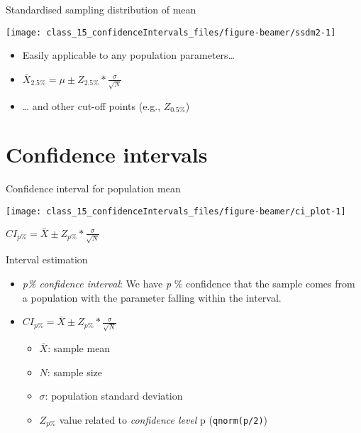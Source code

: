 \documentclass[
  ignorenonframetext,
]{beamer}
\providecommand{\tightlist}{%
  \setlength{\itemsep}{0pt}\setlength{\parskip}{0pt}}
\begin{document}
\begin{frame}{Standardised sampling distribution of mean}
\label{standardised-sampling-distribution-of-mean-1}
\begin{center}\texttt{[image: class\_15\_confidenceIntervals\_files/figure-beamer/ssdm2-1]} \end{center}

\begin{itemize}
\tightlist
\item
  Easily applicable to any population parameters\ldots{}
\item
  \(\bar{X}_{2.5\%} = \mu \pm Z_{2.5\%} * \frac{\sigma}{\sqrt{N}}\)
\item
  \ldots{} and other cut-off points (e.g., \(Z_{0.5\%}\))
\end{itemize}
\end{frame}

\section{Confidence intervals}\label{confidence-intervals}

\begin{frame}{Confidence interval for population mean}
\label{confidence-interval-for-population-mean}
\begin{center}\texttt{[image: class\_15\_confidenceIntervals\_files/figure-beamer/ci\_plot-1]} \end{center}

\(CI_{p\%} = \bar{X} \pm Z_{p\%} * \frac{\sigma}{\sqrt{N}}\)
\end{frame}

\begin{frame}[fragile]{Interval estimation}
\label{interval-estimation}
\begin{itemize}
\item
  \emph{p\% confidence interval}: We have \emph{p} \% confidence that
  the sample comes from a population with the parameter falling within
  the interval.
\item
  \(CI_{p\%} = \bar{X} \pm Z_{p\%} * \frac{\sigma}{\sqrt{N}}\)

  \begin{itemize}
  \tightlist
  \item
    \(\bar{X}\): sample mean
  \item
    \(N\): sample size
  \item
    \(\sigma\): population standard deviation
  \item
    \(Z_{p\%}\) value related to \emph{confidence level} p
    (\texttt{qnorm(p/2)})
  \end{itemize}
\end{itemize}
\end{frame}
\end{document}
